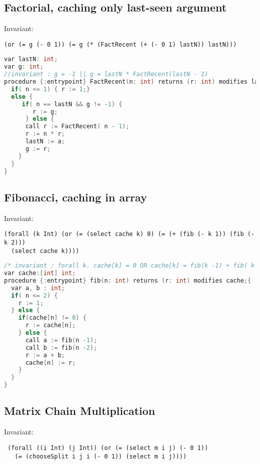 \subsection{Factorial, caching only last-seen argument}
Invariant:
\begin{verbatim}
(or (= g (- 0 1)) (= g (* (FactRecent (+ (- 0 1) lastN)) lastN)))
\end{verbatim}
\begin{lstlisting}[language=c, caption= {Returns factorial of `n', 
      and caches last seen argument in lastN and corresponding return value
    in g}, label=lst:factorialRecent]
var lastN: int;
var g: int;
//invariant : g = -1 || g = lastN * FactRecent(lastN - 1) 
procedure {:entrypoint} FactRecent(n: int) returns (r: int) modifies lastN, g;{
  if( n <= 1) { r := 1;}
  else {
     if( n == lastN && g != -1) {
        r := g;
      } else {
      call r := FactRecent( n - 1);    
      r := n * r;
      lastN := a;
      g := r;
    }
  }
}
\end{lstlisting}

\subsection{Fibonacci, caching in array}
Invariant:
\begin{verbatim}
(forall (k Int) (or (= (select cache k) 0) (= (+ (fib (- k 1)) (fib (- k 2)))
  (select cache k))))
\end{verbatim}
\begin{lstlisting}[language=c, caption= {Returns $n$th Fibonacci number, and
      caches all arguments and return values seen so far in global array `cache'}]
/* invariant : forall k. cache[k] = 0 OR cache[k] = fib(k -1) + fib( k -2) */
var cache:[int] int;
procedure {:entrypoint} fib(n: int) returns (r: int) modifies cache;{
  var a, b : int;
  if( n <= 2) {
    r := 1;
  } else {
    if(cache[n] != 0) {
      r := cache[n];
    } else {
      call a := fib(n -1);
      call b := fib(n -2);
      r := a + b;
      cache[n] := r;
    }
  }
}
\end{lstlisting}

\subsection{Matrix Chain Multiplication}
Invariant:
\begin{verbatim}
 (forall ((i Int) (j Int)) (or (= (select m i j) (- 0 1))
   (= (chooseSplit i j i (- 0 1)) (select m i j))))
\end{verbatim}


